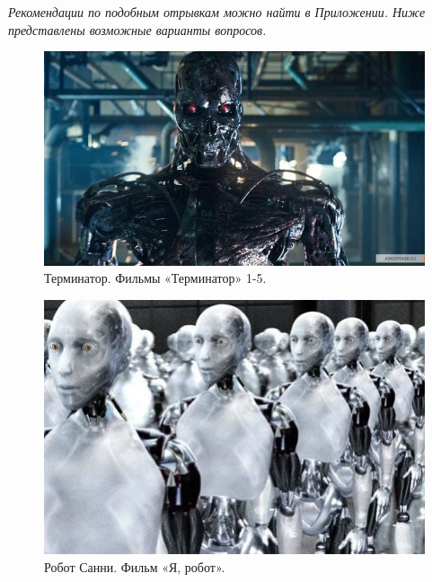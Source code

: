 {\slshape Рекомендации по подобным отрывкам можно найти в Приложении. Ниже представлены возможные варианты вопросов.}
\begin{figure}[h!]
	\begin{center}
		\includegraphics[width=0.98\linewidth]{chapters/chapter1/images/3}
		\caption{Терминатор. Фильмы «Терминатор» 1-5.}
		\label{ris:image1x3}
	\end{center}
\end{figure}
\begin{figure}[h!]
	\begin{center}
		\includegraphics[width=0.98\linewidth]{chapters/chapter1/images/4}
		\caption{Робот Санни. Фильм «Я, робот».}
		\label{ris:image1x4}
	\end{center}
\end{figure}
